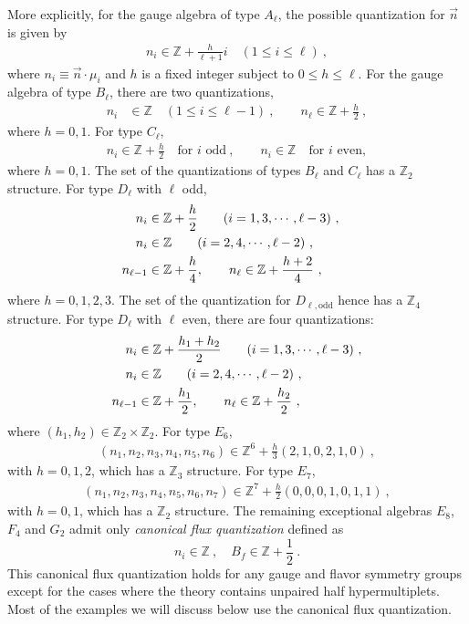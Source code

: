 More explicitly, for the gauge algebra  of type $ A_\ell $, the possible quantization for $ \vec{n} $ is given by
\begin{align}
n_i \in \mathbb{Z} + \frac{h}{\ell+1}i \quad (1 \leq i \leq \ell)\ ,
\end{align}
where $n_i\equiv \vec{n} \cdot \mu_i$ and $ h $ is a fixed integer subject to  $0 \leq h \leq \ell$. 
For the gauge algebra of type $ B_\ell $, there are two quantizations,
\begin{align}
n_i&\in \mathbb{Z} \quad ( 1 \leq i \leq \ell-1 ) \ , \qquad
n_\ell\in \mathbb{Z} + \frac{h}{2} \ ,
\end{align}
where $ h = 0, 1 $. For type $ C_\ell $,
\begin{align}
n_i \in \mathbb{Z} + \frac{h}{2} \quad \text{for $i$ odd} \ , \qquad
n_i\in \mathbb{Z}  \quad \text{for $i$ even},
\end{align}
where $ h = 0, 1 $. The set of the quantizations of types $ B_\ell $ and $ C_\ell $ has a $ \mathbb{Z}_2 $ structure. For  
type $ D_{\ell} $ with $\ell$ odd,
\begin{align}
n_i &\in \mathbb{Z} + \frac{h}{2} \qquad (i = 1, 3, \cdots, \ell-3) \ , \quad\cr
n_i&\in \mathbb{Z}  \qquad (i=2, 4, \cdots, \ell-2) \ , \quad\\
n_{\ell-1}&\in \mathbb{Z} + \frac{h}{4}, \qquad  n_\ell \in \mathbb{Z} + \frac{h+2}{4}  \ , \nonumber
\end{align}
where $ h = 0, 1, 2, 3 $. The set of the quantization for $D_{\ell,\text{odd}}$ hence has a $ \mathbb{Z}_4 $ structure. For  
type $ D_{\ell} $ with $\ell$ even, there are four quantizations:
\begin{align}
n_i  &\in \mathbb{Z} + \frac{h_1 + h_2}{2} \qquad (i = 1, 3, \cdots, \ell-3) \ ,\cr
n_i  &\in \mathbb{Z}  \qquad (i=2, 4, \cdots, \ell-2) \ , \\
n_{\ell-1}&\in \mathbb{Z}+ \frac{h_1}{2},\qquad n_\ell \in \mathbb{Z} + \frac{h_2}{2}\ , \nonumber
\end{align}
where $ (h_1, h_2) \in \mathbb{Z}_2 \times \mathbb{Z}_2 $. For type $ E_6 $,
\begin{align}
(n_1, n_2, n_3, n_4, n_5, n_6) \in \mathbb{Z}^6 + \frac{h}{3}(2, 1, 0, 2, 1, 0)\ ,
\end{align}
with $ h = 0, 1, 2 $, which has a $\mathbb{Z}_3 $ structure. For type $ E_7 $,
\begin{align}
(n_1, n_2, n_3, n_4, n_5, n_6, n_7) \in \mathbb{Z}^7 + \frac{h}{2}(0, 0, 0, 1, 0, 1, 1) \ ,
\end{align}
with $h=0,1$, which has a $ \mathbb{Z}_2 $ structure. The remaining exceptional algebras $ E_8$, $ F_4 $ and $ G_2 $ admit only {\it canonical flux quantization} defined as
\begin{equation}\label{eq:n-B-canon}
	n_i \in \mathbb{Z} \ , \quad B_f \in \mathbb{Z}+\frac{1}{2} \ .
\end{equation}
This canonical flux quantization holds for any gauge and flavor symmetry groups except for the cases where the theory contains unpaired half hypermultiplets. Most of the examples we will discuss below use the canonical flux quantization. 

